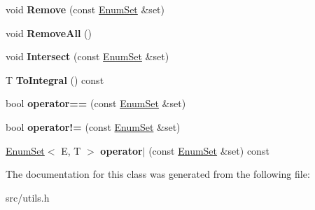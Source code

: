 \begin{DoxyCompactItemize}
\item 
\hypertarget{classv8_1_1internal_1_1_enum_set_a06cae32ab5465dc2c5676c7ef2617e6a}{}void {\bfseries Remove} (const \hyperlink{classv8_1_1internal_1_1_enum_set}{Enum\+Set} \&set)\label{classv8_1_1internal_1_1_enum_set_a06cae32ab5465dc2c5676c7ef2617e6a}

\item 
\hypertarget{classv8_1_1internal_1_1_enum_set_a43cbbc3281c551f18b3d156005272a34}{}void {\bfseries Remove\+All} ()\label{classv8_1_1internal_1_1_enum_set_a43cbbc3281c551f18b3d156005272a34}

\item 
\hypertarget{classv8_1_1internal_1_1_enum_set_aa04525460c1a2f5967bd65979e8c29a7}{}void {\bfseries Intersect} (const \hyperlink{classv8_1_1internal_1_1_enum_set}{Enum\+Set} \&set)\label{classv8_1_1internal_1_1_enum_set_aa04525460c1a2f5967bd65979e8c29a7}

\item 
\hypertarget{classv8_1_1internal_1_1_enum_set_a5c4ea283f611fd20cf3e217ff4f86262}{}T {\bfseries To\+Integral} () const \label{classv8_1_1internal_1_1_enum_set_a5c4ea283f611fd20cf3e217ff4f86262}

\item 
\hypertarget{classv8_1_1internal_1_1_enum_set_a77b1d6ab479998ace55f445a9b517e09}{}bool {\bfseries operator==} (const \hyperlink{classv8_1_1internal_1_1_enum_set}{Enum\+Set} \&set)\label{classv8_1_1internal_1_1_enum_set_a77b1d6ab479998ace55f445a9b517e09}

\item 
\hypertarget{classv8_1_1internal_1_1_enum_set_a8fa403add1ad907344e9f4f86abec24f}{}bool {\bfseries operator!=} (const \hyperlink{classv8_1_1internal_1_1_enum_set}{Enum\+Set} \&set)\label{classv8_1_1internal_1_1_enum_set_a8fa403add1ad907344e9f4f86abec24f}

\item 
\hypertarget{classv8_1_1internal_1_1_enum_set_ac1e911226bcaa21e72bc344fced8c24d}{}\hyperlink{classv8_1_1internal_1_1_enum_set}{Enum\+Set}$<$ E, T $>$ {\bfseries operator$\vert$} (const \hyperlink{classv8_1_1internal_1_1_enum_set}{Enum\+Set} \&set) const \label{classv8_1_1internal_1_1_enum_set_ac1e911226bcaa21e72bc344fced8c24d}

\end{DoxyCompactItemize}


The documentation for this class was generated from the following file\+:\begin{DoxyCompactItemize}
\item 
src/utils.\+h\end{DoxyCompactItemize}
